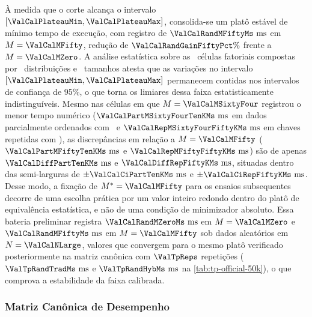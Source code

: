 \documentclass[12pt]{article}
\begin{document}
À medida que o corte alcança o intervalo $[\ValCalPlateauMin, \ValCalPlateauMax]$, consolida-se um platô estável de mínimo tempo de execução, com registro de $\ValCalRandMFiftyMs\text{ ms}$ em $M = \ValCalMFifty$, redução de $\ValCalRandGainFiftyPct\%$ frente a $M = \ValCalMZero$. A análise estatística sobre as \ValCalNumCells\ células fatoriais compostas por \ValCalNumDists\ distribuições e \ValCalNumSizes\ tamanhos atesta que as variações no intervalo $[\ValCalPlateauMin, \ValCalPlateauMax]$ permanecem contidas nos intervalos de confiança de 95\%, o que torna os limiares dessa faixa estatisticamente indistinguíveis. Mesmo nas células em que $M = \ValCalMSixtyFour$ registrou o menor tempo numérico ($\ValCalPartMSixtyFourTenKMs\text{ ms}$ em dados parcialmente ordenados com \ValCalNSmallK\ e $\ValCalRepMSixtyFourFiftyKMs\text{ ms}$ em chaves repetidas com \ValCalNLargeK), as discrepâncias em relação a $M = \ValCalMFifty$ ($\ValCalPartMFiftyTenKMs\text{ ms}$ e $\ValCalRepMFiftyFiftyKMs\text{ ms}$) são de apenas $\ValCalDiffPartTenKMs\text{ ms}$ e $\ValCalDiffRepFiftyKMs\text{ ms}$, situadas dentro das semi-larguras de $\pm \ValCalCiPartTenKMs\text{ ms}$ e $\pm \ValCalCiRepFiftyKMs\text{ ms}$. Desse modo, a fixação de $M^* = \ValCalMFifty$ para os ensaios subsequentes decorre de uma escolha prática por um valor inteiro redondo dentro do platô de equivalência estatística, e não de uma condição de minimizador absoluto. Essa bateria preliminar registra $\ValCalRandMZeroMs\text{ ms}$ em $M = \ValCalMZero$ e $\ValCalRandMFiftyMs\text{ ms}$ em $M = \ValCalMFifty$ sob dados aleatórios em $N = \ValCalNLarge$, valores que convergem para o mesmo platô verificado posteriormente na matriz canônica com $\ValTpReps$ repetições ($\ValTpRandTradMs\text{ ms}$ e $\ValTpRandHybMs\text{ ms}$ na \cref{tab:tp-official-50k}), o que comprova a estabilidade da faixa calibrada.

\subsubsection{Matriz Canônica de Desempenho}\label{sec:res-matriz-tp}
\end{document}
